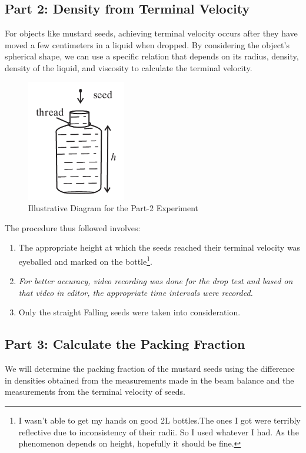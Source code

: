 \documentclass[twocolumn,11pt]{article}
\begin{document}
\subsection{Part 2: Density from Terminal Velocity}
For objects like mustard seeds, achieving terminal velocity occurs after they have moved a few centimeters in a liquid when dropped. By considering the object's spherical shape, we can use a specific relation that depends on its radius, density, density of the liquid, and viscosity to calculate the terminal velocity.
\begin{figure}[H]
    \centering
    \includegraphics{part2-fig.png}
    \caption{Illustrative Diagram for the Part-2 Experiment}
    \label{Illustrative Diagram for the Part-2 Experiment}
\end{figure}
The procedure thus followed involves:
\begin{enumerate}
    \item The appropriate height at which the seeds reached their terminal velocity was eyeballed and marked on the bottle\footnote{I wasn't able to get my hands on good 2L bottles.The ones I got were terribly reflective due to inconsistency of their radii. So I used whatever I had. As the phenomenon depends on height, hopefully it should be fine.}.
    \item \textit{For better accuracy, video recording was done for the drop test and based on that video in editor, the appropriate time intervals were recorded.}
    \item Only the straight Falling seeds were taken into consideration.
\end{enumerate}
\subsection{Part 3: Calculate the Packing Fraction}
We will determine the packing fraction of the mustard seeds using the difference in densities obtained from the measurements made in the beam balance and the measurements from the terminal velocity of seeds.
\end{document}
